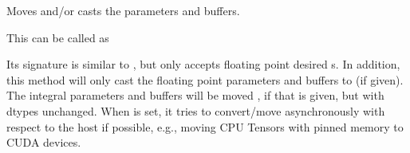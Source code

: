 \documentclass[letterpaper,10pt,english]{sphinxmanual}
\begin{document}
\begin{fulllineitems}
\begin{fulllineitems}
\end{fulllineitems}


\begin{fulllineitems}
\label{\detokenize{api/dynamics:geology.metamodelling.dynamics.NeuralDifferentialEquation.to}}
Moves and/or casts the parameters and buffers.

This can be called as

\begin{fulllineitems}
\end{fulllineitems}


\begin{fulllineitems}
\end{fulllineitems}


\begin{fulllineitems}
\end{fulllineitems}


Its signature is similar to , but only accepts
floating point desired  s. In addition, this method will
only cast the floating point parameters and buffers to 
(if given). The integral parameters and buffers will be moved
, if that is given, but with dtypes unchanged. When
 is set, it tries to convert/move asynchronously
with respect to the host if possible, e.g., moving CPU Tensors with
pinned memory to CUDA devices.


\end{fulllineitems}
\end{fulllineitems}
\end{document}
